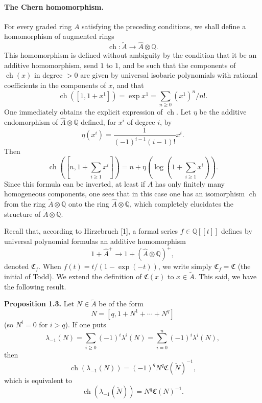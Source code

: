 \documentclass[11pt]{article}
\newcommand{\ch}{\operatorname{ch}}
\providecommand{\Q}{\mathbb Q}
\providecommand{\Ahat}{\widehat A}
\providecommand{\Ahp}{\widehat A^{+}}
\providecommand{\ch}{\operatorname{ch}}
\begin{document}
\paragraph{The Chern homomorphism.}
For every graded ring $A$ satisfying the preceding conditions, we shall define a homomorphism of augmented rings
\begin{equation}\tag{1.26}
\ch:\widetilde A\longrightarrow \Ahat\otimes\Q.
\end{equation}
This homomorphism is defined without ambiguity by the condition that it be an additive homomorphism, send $1$ to $1$, and be such that the components of $\ch(x)$ in degree $>0$ are given by universal isobaric polynomials with rational coefficients in the components of $x$, and that
\begin{equation}\tag{1.27}
\ch([1,1+x^1])=\exp x^1=\sum_{n\geq 0}(x^1)^n/n!.
\end{equation}
One immediately obtains the explicit expression of $\ch$. Let $\eta$ be the additive endomorphism of $\Ahat\otimes\Q$ defined, for $x^i$ of degree $i$, by
\begin{equation}\tag{1.28}
\eta(x^i)=\frac{1}{(-1)^{i-1}(i-1)!}x^i .
\end{equation}
Then
\begin{equation}\tag{1.29}
\ch\left([n,1+\sum_{i\geq 1}x^i]\right)
=n+\eta\left(\log\left(1+\sum_{i\geq 1}x^i\right)\right).
\end{equation}
Since this formula can be inverted, at least if $A$ has only finitely many homogeneous components, one sees that in this case one has an isomorphism $\ch$ from the ring $\widetilde A\otimes\Q$ onto the ring $\Ahat\otimes\Q$, which completely elucidates the structure of $\widetilde A\otimes\Q$.

Recall that, according to Hirzebruch [1], a formal series $f\in\Q[[t]]$ defines by universal polynomial formulas an additive homomorphism
\[
1+\Ahp\longrightarrow 1+(\Ahat\otimes\Q)^+,
\]
denoted $\mathfrak C_f$. When $f(t)=t/(1-\exp(-t))$, we write simply $\mathfrak C_f=\mathfrak C$ (the initial of Todd). We extend the definition of $\mathfrak C(x)$ to $x\in\widetilde A$. This said, we have the following result.

\textbf{Proposition 1.3.} Let $N\in\widetilde A$ be of the form
\[
N=[q,1+N^1+\cdots+N^q]
\]
(so $N^i=0$ for $i>q$). If one puts
\[
\lambda_{-1}(N)=\sum_{i\geq 0}(-1)^i\lambda^i(N)=\sum_{i=0}^{n}(-1)^i\lambda^i(N),
\]
then
\begin{equation}\tag{1.30}
\ch(\lambda_{-1}(N))=(-1)^qN^q\mathfrak C(\check N)^{-1},
\end{equation}
which is equivalent to
\begin{equation}\tag{1.30 bis}
\ch(\lambda_{-1}(\check N))=N^q\mathfrak C(N)^{-1}.
\end{equation}
\end{document}
